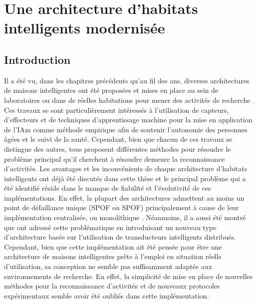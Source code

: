 \chapter{Une architecture d'habitats intelligents modernisée}
\label{chap:5}

\section{Introduction}

Il a été vu, dans les chapitres précédents qu'au fil des ans, diverses architectures de maisons intelligentes ont été proposées et mises en place au sein de laboratoires ou dans de réelles habitations pour mener des activités de recherche \citep{DJCook2003,Helal2005,Giroux2009,Cook2013,Bouchard2014,Lago2017,Plantevin2018}. Ces travaux se sont particulièrement intéressés à l'utilisation de capteurs, d'effecteurs et de techniques d'apprentissage machine pour la mise en application de l'\acl{IAm} comme méthode empirique afin de soutenir l'autonomie des personnes âgées et le suivi de la santé. Cependant, bien que chacun de ces travaux se distingue des autres, tous proposent différentes méthodes pour résoudre le problème principal qu'il cherchent à résoudre demeure la reconnaissance d'activités. Les avantages et les inconvénients de chaque architecture d'habitats intelligents ont déjà été discutés dans cette thèse et le principal problème qui a été identifié réside dans le manque de fiabilité et l'évolutivité de ces implémentations. En effet, la plupart des architectures admettent au moins un point de défaillance unique (\acl{SPOF} ou \acs{SPOF}) principalement à cause de leur implémentation centralisée, ou \og monolithique \fg. Néanmoins, il a aussi été montré que \cite{Plantevin2018} ont adressé cette problématique en introduisant un nouveau type d'architecture basée sur l'utilisation de transducteurs intelligents distribués. Cependant, bien que cette implémentation ait été pensée pour être une architecture de maisons intelligentes prête à l'emploi en situation réelle d'utilisation, sa conception ne semble pas suffisamment adaptée aux environnements de recherche. En effet, la simplicité de mise en place de nouvelles méthodes pour la reconnaissance d'activités et de nouveaux protocoles expérimentaux semble avoir été oubliés dans cette implémentation.

